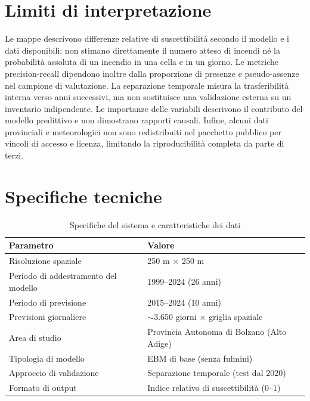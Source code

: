 \documentclass[11pt,a4paper]{article}
\begin{document}
\section{Limiti di interpretazione}

Le mappe descrivono differenze relative di suscettibilità secondo il modello e i dati disponibili; non stimano direttamente il numero atteso di incendi né la probabilità assoluta di un incendio in una cella e in un giorno. Le metriche precision-recall dipendono inoltre dalla proporzione di presenze e pseudo-assenze nel campione di valutazione. La separazione temporale misura la trasferibilità interna verso anni successivi, ma non sostituisce una validazione esterna su un inventario indipendente. Le importanze delle variabili descrivono il contributo del modello predittivo e non dimostrano rapporti causali. Infine, alcuni dati provinciali e meteorologici non sono redistribuiti nel pacchetto pubblico per vincoli di accesso e licenza, limitando la riproducibilità completa da parte di terzi.

\section{Specifiche tecniche}

\begin{table}[H]
\centering
\caption{Specifiche del sistema e caratteristiche dei dati}
\label{tab:specs}
\begin{tabular}{ll}
\toprule
\textbf{Parametro} & \textbf{Valore} \\
\midrule
Risoluzione spaziale & 250 m $\times$ 250 m \\
Periodo di addestramento del modello & 1999--2024 (26 anni) \\
Periodo di previsione & 2015--2024 (10 anni) \\
Previsioni giornaliere & $\sim$3.650 giorni $\times$ griglia spaziale \\
Area di studio & Provincia Autonoma di Bolzano (Alto Adige) \\
Tipologia di modello & EBM di base (senza fulmini) \\
Approccio di validazione & Separazione temporale (test dal 2020) \\
Formato di output & Indice relativo di suscettibilità (0--1) \\
\bottomrule
\end{tabular}
\end{table}
\end{document}
